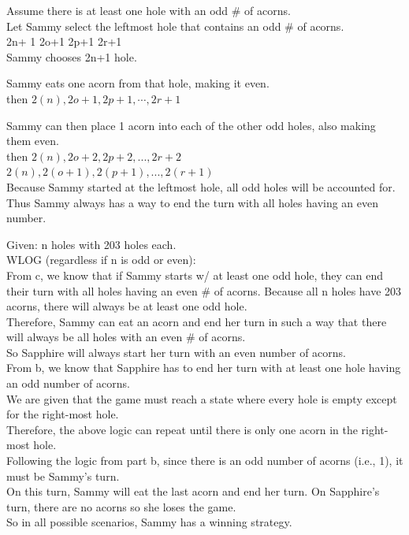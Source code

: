 \documentclass[12pt]{exam}
\begin{document}
\begin{solution}
\begin{qparts}
\item 
Assume there is at least one hole with an odd \# of acorns.\\
Let Sammy select the leftmost hole that contains an odd \# of acorns.\\
2n+ 1 2o+1 2p+1 2r+1\\
Sammy chooses 2n+1 hole.

Sammy eats one acorn from that hole, making it even.\\ 
then $2(n), 2o+1, 2p+1,\cdots,2r+1$

Sammy can then place 1 acorn into each of the other odd holes, also making them even. \\
then $2(n), 2o+2, 2p+2, ... ,2r+2$\\
$2(n), 2(o+1), 2(p+1), ... ,2(r+1)$
\\Because Sammy started at the leftmost hole, all odd holes will be accounted for. \\
Thus Sammy always has a way to end the turn with all holes having an even number.

\item  
Given: n holes with 203 holes each.\\
WLOG (regardless if n is odd or even):\\
From c, we know that if Sammy starts w/ at least one odd hole, they can end their turn with all holes having an even \# of acorns. Because all n holes have 203 acorns, there will always be at least one odd hole.\\
Therefore, Sammy can eat an acorn and end her turn in such a way that there will always be all holes with an even \# of acorns.\\
So Sapphire will always start her turn with an even number of acorns.\\
From b, we know that Sapphire has to end her turn with at least one hole having an odd number of acorns.\\
We are given that the game must reach a state where every hole is empty except for the right-most hole.\\
Therefore, the above logic can repeat until there is only one acorn in the right-most hole.\\
Following the logic from part b, since there is an odd number of acorns (i.e., 1), it must be Sammy’s turn.\\
On this turn, Sammy will eat the last acorn and end her turn. 
On Sapphire’s turn, there are no acorns so she loses the game.
\\So in all possible scenarios, Sammy has a winning strategy.
\end{qparts}
\end{solution}
\end{document}
